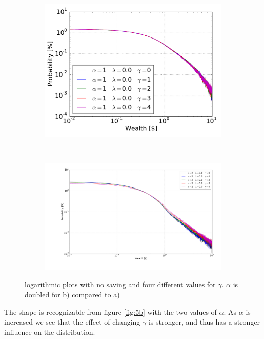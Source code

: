 \begin{figure}[H]
    \centering
    \begin{subfigure}{0.5\textwidth}
        \centering
        \includegraphics[width=\linewidth]{result/5e/5e-1-00-loglog}
        \caption{}
    \end{subfigure}%
    ~ 
    \begin{subfigure}{0.5\textwidth}
        \centering
        \includegraphics[width=\linewidth]{result/5e/5e-2-00-loglog}
        \caption{}
    \end{subfigure}
    \caption{logarithmic plots with no saving and four different values for $\gamma$. $\alpha$ is doubled for b) compared to a)}
    \label{fig:loglog1}
\end{figure}

The shape is recognizable from figure \ref{fig:5b} with the two values of $\alpha$. As $\alpha$ is increased we see that the effect of changing $\gamma$ is stronger, and thus has a stronger influence on the distribution. 

